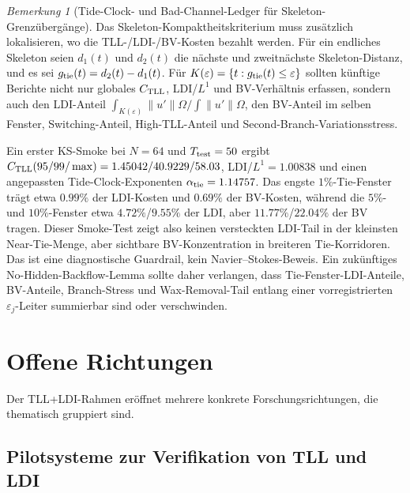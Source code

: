 \documentclass[12pt,a4paper]{article}
\theoremstyle{definition}
\theoremstyle{plain}
\theoremstyle{remark}
\newtheorem{remark}[definition]{Bemerkung}
\begin{document}
\begin{remark}[Tide-Clock- und Bad-Channel-Ledger für Skeleton-Grenzübergänge]
\label{rem:tide-clock-ledger}
Das Skeleton-Kompaktheitskriterium muss zusätzlich lokalisieren, wo die
TLL-/LDI-/BV-Kosten bezahlt werden.  Für ein endliches Skeleton seien
\(d_1(t)\) und \(d_2(t)\) die nächste und zweitnächste
Skeleton-Distanz, und es sei \(g_{\rm tie}(t)=d_2(t)-d_1(t)\).  Für
\(K(\varepsilon)=\{t:g_{\rm tie}(t)\le \varepsilon\}\) sollten
künftige Berichte nicht nur globales \(C_{\rm TLL}\), LDI/\(L^1\) und
BV-Verhältnis erfassen, sondern auch den LDI-Anteil
\(\int_{K(\varepsilon)}\|u'\|\Omega/\int\|u'\|\Omega\), den
BV-Anteil im selben Fenster, Switching-Anteil, High-TLL-Anteil und
Second-Branch-Variationsstress.

Ein erster KS-Smoke bei \(N=64\) und \(T_{\rm test}=50\) ergibt
\(C_{\rm TLL}(95/99/\max)=1.45042/40.9229/58.03\),
LDI/\(L^1=1.00838\) und einen angepassten Tide-Clock-Exponenten
\(\alpha_{\rm tie}=1.14757\).  Das engste \(1\%\)-Tie-Fenster trägt
etwa \(0.99\%\) der LDI-Kosten und \(0.69\%\) der BV-Kosten, während
die \(5\%\)- und \(10\%\)-Fenster etwa \(4.72\%\)/\(9.55\%\) der LDI,
aber \(11.77\%\)/\(22.04\%\) der BV tragen.  Dieser Smoke-Test zeigt
also keinen versteckten LDI-Tail in der kleinsten Near-Tie-Menge, aber
sichtbare BV-Konzentration in breiteren Tie-Korridoren.  Das ist eine
diagnostische Guardrail, kein Navier--Stokes-Beweis.  Ein zukünftiges
No-Hidden-Backflow-Lemma sollte daher verlangen, dass
Tie-Fenster-LDI-Anteile, BV-Anteile, Branch-Stress und Wax-Removal-Tail
entlang einer vorregistrierten \(\varepsilon_j\)-Leiter summierbar sind
oder verschwinden.
\end{remark}

\section{Offene Richtungen}
\label{sec:open-directions}

Der TLL+LDI-Rahmen eröffnet mehrere konkrete Forschungsrichtungen,
die thematisch gruppiert sind.

\subsection{Pilotsysteme zur Verifikation von TLL und LDI}
\end{document}
